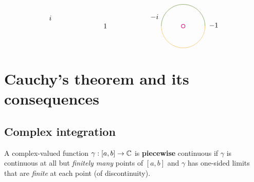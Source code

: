 \documentclass[12pt]{article}
\begin{document}
\[\begin{tikzpicture}[x=0.75pt,y=0.75pt,yscale=-1,xscale=1]
    \draw [shift={(320.8,130)}, rotate = 180] [color=magenta  ,draw opacity=1 ][line width=0.75]      (0, 0) circle [x radius= 3.35, y radius= 3.35]   ;
    \draw  [draw opacity=0] (280.28,130) .. controls (280.28,107.62) and (298.42,89.48) .. (320.8,89.48) .. controls (343.18,89.48) and (361.32,107.62) .. (361.32,130) -- (320.8,130) -- cycle ; \draw [color={rgb, 255:red, 65; green, 117; blue, 5 }  ,draw opacity=1 ]   (280.28,130) .. controls (280.28,107.62) and (298.42,89.48) .. (320.8,89.48) .. controls (343.18,89.48) and (361.32,107.62) .. (361.32,130) ;  
    \draw  [draw opacity=0] (361.32,130) .. controls (361.32,130) and (361.32,130) .. (361.32,130) .. controls (361.32,130) and (361.32,130) .. (361.32,130) .. controls (361.32,152.38) and (343.18,170.52) .. (320.8,170.52) .. controls (298.42,170.52) and (280.28,152.38) .. (280.28,130) -- (320.8,130) -- cycle ; \draw [color={rgb, 255:red, 245; green, 166; blue, 35 }  ,draw opacity=1 ]   (361.32,130) .. controls (361.32,130) and (361.32,130) .. (361.32,130) .. controls (361.32,152.38) and (343.18,170.52) .. (320.8,170.52) .. controls (298.42,170.52) and (280.28,152.38) .. (280.28,130) ;  
    
    \draw (171.6,124.6) node [anchor=north west][inner sep=0.75pt]    {$1$};
    \draw (70.8,109.2) node [anchor=north west][inner sep=0.75pt]    {$i$};
    \draw (367.6,122.8) node [anchor=north west][inner sep=0.75pt]    {$-1$};
    \draw (258.8,106.8) node [anchor=north west][inner sep=0.75pt]    {$-i$};
    
    
    \end{tikzpicture}
    \]

\section{Cauchy's theorem and its consequences}

\subsection{Complex integration}
 A complex-valued function $\gamma:[a,b]\to \mathbb{C}$ is \textbf{piecewise} continuous if $\gamma$ is continuous at all but \textit{finitely many} points of $[a,b]$ and $\gamma$ has one-sided limits that are \textit{finite} at each point (of discontinuity).
\end{document}
